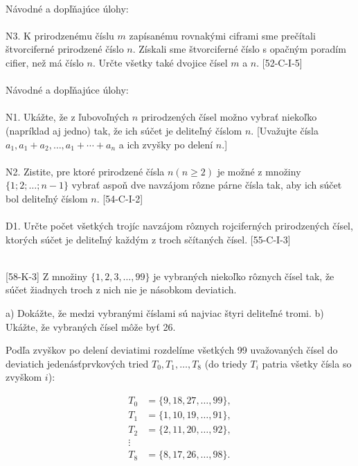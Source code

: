 \\

Návodné a dopľňajúce úlohy:\\
\\
N3. K prirodzenému číslu $m$ zapísanému rovnakými ciframi sme prečítali štvorciferné prirodzené číslo $n$. Získali sme štvorciferné číslo s opačným poradím cifier, než má
číslo $n$. Určte všetky také dvojice čísel $m$ a $n$. [52-C-I-5]\\
\\

Návodné a dopľňajúce úlohy:\\
\\
N1. Ukážte, že z ľubovoľných $n$ prirodzených čísel možno vybrať niekoľko (napríklad aj jedno) tak, že ich súčet je deliteľný číslom $n$. [Uvažujte čísla $a_1, a_1 +a_2, \ldots , a_1 + \cdots  + a_n$ a ich zvyšky po delení $n$.]\\
\\
N2. Zistite, pre ktoré prirodzené čísla $n (n \geq 2)$ je možné z množiny $\{1; 2; \ldots; n -1\}$ vybrať aspoň dve navzájom rôzne párne čísla tak, aby ich súčet bol deliteľný číslom $n$. [54-C-I-2]\\
\\
D1. Určte počet všetkých trojíc navzájom rôznych  rojciferných prirodzených čísel, ktorých súčet je deliteľný každým z troch sčítaných čísel. [55-C-I-3]\\
\\
\begin{tcolorbox}[breakable,notitle,boxrule=0pt,colback=light-gray,colframe=light-gray]\ul [58-K-3]
Z množiny $\{1, 2, 3, \ldots , 99\}$ je vybraných niekoľko rôznych čísel tak, že súčet žiadnych troch z nich nie je násobkom deviatich.

a) Dokážte, že medzi vybranými číslami sú najviac štyri deliteľné tromi.
b) Ukážte, že vybraných čísel môže byť 26.

\end{tcolorbox}

\rieh Podľa zvyškov po delení deviatimi rozdelíme všetkých 99 uvažovaných čísel do deviatich jedenásťprvkových tried $T_0, T_1 , \ldots, T_8$ (do triedy $T_i$ patria všetky čísla so zvyškom $i$):
\begin{center}
\begin{align*}
T_0 &= \{9, 18, 27, \ldots , 99\},\\
T_1 &= \{1, 10, 19, \ldots, 91\},\\
T_2 &= \{2, 11, 20, \ldots , 92\},\\
\vdots\\
T_8 &= \{8, 17, 26, \ldots , 98\}.
\end{align*}
\end{center}

